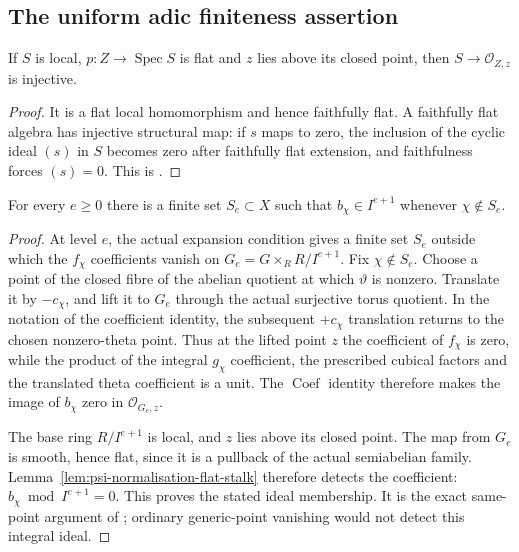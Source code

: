 \subsection{The uniform adic finiteness assertion}
\begin{srlemma}
\label{lem:psi-normalisation-flat-stalk}
If \(S\) is local, \(p:Z\to\operatorname{Spec}S\) is flat
and \(z\) lies above its closed point, then
\(S\to\mathcal O_{Z,z}\) is injective.
\end{srlemma}
\begin{proof}
It is a flat local homomorphism and hence faithfully flat.
A faithfully flat algebra has injective structural map:
if \(s\) maps to zero, the inclusion of the cyclic ideal
\((s)\) in \(S\) becomes zero after faithfully flat
extension, and faithfulness forces \((s)=0\).
This is .
\end{proof}

\begin{srproposition}
\label{prop:psi-normalisation-adic}
For every \(e\geq0\) there is a finite set \(S_e\subset X\)
such that \(b_\chi\in I^{e+1}\) whenever \(\chi\notin S_e\).
\end{srproposition}
\begin{proof}
At level \(e\), the actual expansion condition gives a
finite set \(S_e\) outside which the \(f_\chi\) coefficients
vanish on \(G_e=G\times_R R/I^{e+1}\).
Fix \(\chi\notin S_e\).
Choose a point of the closed fibre of the abelian quotient
at which \(\vartheta\) is nonzero.
Translate it by \(-c_\chi\), and lift it to \(G_e\)
through the actual surjective torus quotient.
In the notation of the coefficient identity, the
subsequent \(+c_\chi\) translation returns to the chosen
nonzero-theta point. Thus at the lifted point \(z\) the
coefficient of \(f_\chi\) is zero, while the product of
the integral \(g_\chi\) coefficient, the prescribed
cubical factors and the translated theta coefficient
is a unit.
The \(\operatorname{Coef}\) identity therefore makes the
image of \(b_\chi\) zero in \(\mathcal O_{G_e,z}\).

The base ring \(R/I^{e+1}\) is local, and \(z\) lies
above its closed point. The map from \(G_e\) is smooth,
hence flat, since it is a pullback of the actual
semiabelian family. Lemma~\ref{lem:psi-normalisation-flat-stalk}
therefore detects the coefficient:
\(b_\chi\bmod I^{e+1}=0\).
This proves the stated ideal membership.
It is the exact same-point argument of
; ordinary generic-point vanishing
would not detect this integral ideal.
\end{proof}

